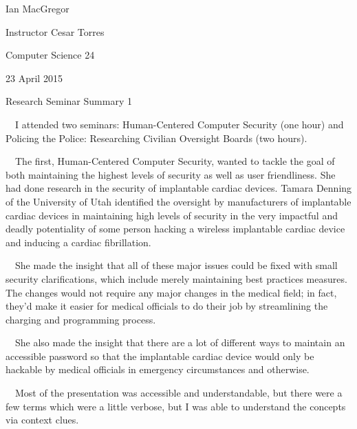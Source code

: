 \documentclass{article}
\title{}
\begin{document}
Ian MacGregor

Instructor Cesar Torres

Computer Science 24

23 April 2015

\begin{center}
Research Seminar Summary 1
\end{center}

\ \ I attended two seminars: Human-Centered Computer Security (one hour) and Policing the Police: Researching Civilian Oversight Boards (two hours). 

\ \ The first, Human-Centered Computer Security, wanted to tackle the goal of both maintaining the highest levels of security as well as user friendliness. She had done research in the security of implantable cardiac devices. Tamara Denning of the University of Utah identified the oversight by manufacturers of implantable cardiac devices in maintaining high levels of security in the very impactful and deadly potentiality of some person hacking a wireless implantable cardiac device and inducing a cardiac fibrillation. 

\ \ She made the insight that all of these major issues could be fixed with small security clarifications, which include merely maintaining best practices measures. The changes would not require any major changes in the medical field; in fact, they'd make it easier for medical officials to do their job by streamlining the charging and programming process. 

\ \ She also made the insight that there are a lot of different ways to maintain an accessible password so that the implantable cardiac device would only be hackable by medical officials in emergency circumstances and otherwise. 

\ \ Most of the presentation was accessible and understandable, but there were a few terms which were a little verbose, but I was able to understand the concepts via context clues. 
\end{document}
